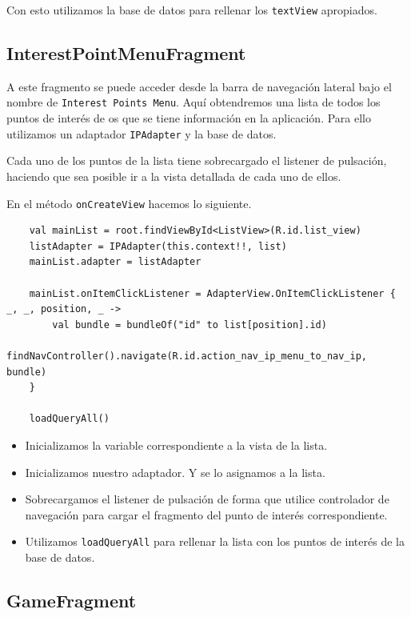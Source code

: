 \documentclass[11pt]{article}
\begin{document}
Con esto utilizamos la base de datos para rellenar los \texttt{textView} apropiados.

\subsection{InterestPointMenuFragment}
\label{sec:org0d3ea30}

A este fragmento se puede acceder desde la barra de navegación lateral bajo el nombre de \texttt{Interest Points Menu}. Aquí obtendremos una lista de todos los puntos de interés de os que se tiene información en la aplicación. Para ello utilizamos un adaptador \texttt{IPAdapter} y la base de datos.

Cada uno de los puntos de la lista tiene sobrecargado el listener de pulsación, haciendo que sea posible ir a la vista detallada de cada uno de ellos.

En el método \texttt{onCreateView} hacemos lo siguiente.

\begin{verbatim}
    val mainList = root.findViewById<ListView>(R.id.list_view)
    listAdapter = IPAdapter(this.context!!, list)
    mainList.adapter = listAdapter

    mainList.onItemClickListener = AdapterView.OnItemClickListener { _, _, position, _ ->
        val bundle = bundleOf("id" to list[position].id)
        findNavController().navigate(R.id.action_nav_ip_menu_to_nav_ip, bundle)
    }
    
    loadQueryAll()
\end{verbatim}

\begin{itemize}
\item Inicializamos la variable correspondiente a la vista de la lista.
\item Inicializamos nuestro adaptador. Y se lo asignamos a la lista.
\item Sobrecargamos el listener de pulsación de forma que utilice controlador de navegación para cargar el fragmento del punto de interés correspondiente.
\item Utilizamos \texttt{loadQueryAll} para rellenar la lista con los puntos de interés de la base de datos.
\end{itemize}

\subsection{GameFragment}
\label{sec:org8c9611b}
\end{document}
